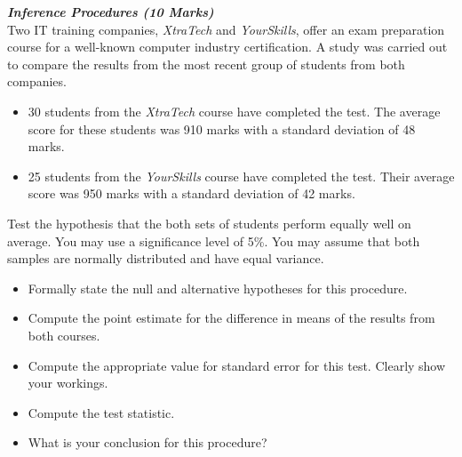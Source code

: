 \begin{itemize}
\begin{itemize}
\end{itemize}

\item[(b)] \textbf{\textit{Inference Procedures (10 Marks)}}\\
Two IT training companies, \textit{XtraTech} and \textit{YourSkills}, offer an exam preparation course for a well-known computer industry certification. 
A study was carried out to compare the results from the most recent group of students from both companies.
\begin{itemize}

\item[$\bullet$]30 students from the \textit{XtraTech} course have completed the test. The average score for these students was 910 marks with a standard deviation of 48 marks.


\item[$\bullet$]25 students from the \textit{YourSkills} course have completed the test. Their average score was 950 marks with a standard deviation of 42 marks.
\end{itemize}

Test the hypothesis that the both sets of students perform equally well on average. You may use a significance level of 5\%. You may assume that both samples are normally distributed and have equal variance.
\begin{itemize}

\item  Formally state the null and alternative hypotheses for this procedure.

\item  Compute the point estimate for the difference in means of the results from both courses.

\item  Compute the appropriate value for standard error for this test. Clearly show your workings.

\item   Compute the test statistic.

\item   What is your conclusion for this procedure?
\end{itemize}

